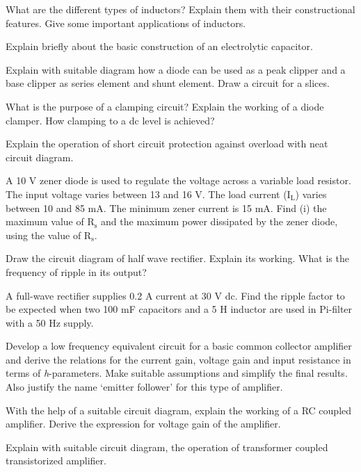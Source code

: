 \markB

\newpage\again

\partC

\item \iitem \iitem What are the different types of inductors? Explain them with their constructional 
  features. Give some important applications of inductors. 
\item Explain briefly about the basic construction of an electrolytic 
  capacitor. 
\ene
\Or
\item \iitem Explain with suitable diagram how a diode can be used as a peak clipper and a base clipper
  as series element and shunt element. Draw a circuit for a slices. 
\item What is the purpose of a clamping circuit? Explain the working of a diode clamper. How clamping
  to a dc level is achieved? 
\ene\ene

\item \iitem \iitem Explain the operation of short circuit protection against overload with neat circuit
  diagram. 
\item A 10 V zener diode is used to regulate the voltage across a variable load resistor. The input voltage
  varies between 13 and 16 V. The load current (I$_\text{L}$) varies between 10 and 85 mA. The minimum zener
  current is 15 mA. Find (i) the maximum value of R$_\text{s}$ and the maximum power dissipated by the zener
  diode, using the value of R$_\text{s}$. 
\ene
\Or
\item \iitem Draw the circuit diagram of half wave rectifier. Explain its working. What is the frequency
  of ripple in its output? 
\item A full-wave rectifier supplies 0.2 A current at 30 V dc. Find the ripple factor to be expected when two
  100 mF capacitors and a 5 H inductor are used in Pi-filter with a 50 Hz supply. 
\ene \ene

\item \iitem Develop a low frequency equivalent circuit for a basic common collector amplifier and derive
  the relations for the current gain, voltage gain and input resistance in terms of {\em h}-parameters.
  Make suitable assumptions and simplify the final results. Also justify the name `emitter follower' for this
  type of amplifier. 
\Or
\item \iitem With the help of a suitable circuit diagram, explain the working of a RC coupled amplifier.
  Derive the expression for voltage gain of the amplifier. 
\item Explain with suitable circuit diagram, the operation of transformer
  coupled transistorized amplifier. 
\ene\ene

